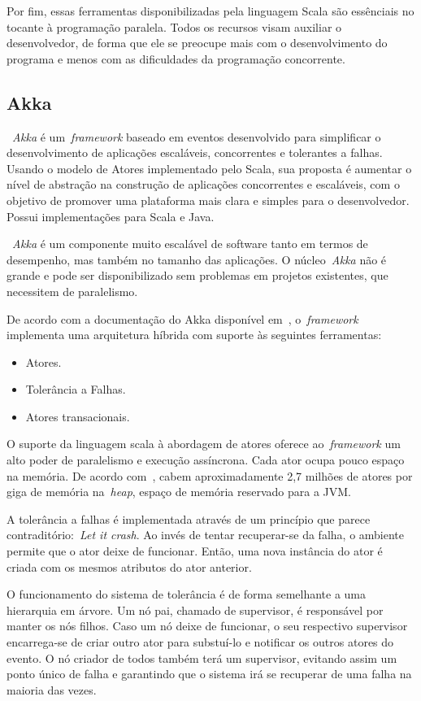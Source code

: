 Por fim, essas ferramentas disponibilizadas pela linguagem Scala são essênciais no tocante à programação paralela. Todos os recursos visam auxiliar o desenvolvedor, de forma que ele se preocupe mais com o desenvolvimento do programa e menos com as dificuldades da programação concorrente.

\subsection{Akka}

~\emph{Akka} é um~\emph{framework} baseado em eventos desenvolvido para simplificar o desenvolvimento de aplicações escaláveis, concorrentes e tolerantes a falhas. Usando o modelo de Atores implementado pelo Scala, sua proposta é aumentar o nível de abstração na construção de aplicações concorrentes e escaláveis, com o objetivo de promover uma plataforma mais clara e simples para o desenvolvedor. Possui implementações para Scala e Java.

~\emph{Akka} é um componente muito escalável de software tanto em termos de desempenho, mas também no tamanho das aplicações. O núcleo~\emph{Akka} não é grande e pode ser disponibilizado sem problemas em projetos existentes, que necessitem de paralelismo. 

De acordo com a documentação do Akka disponível em~\cite{akkaSite}, o~\emph{framework} implementa uma arquitetura híbrida com suporte às seguintes ferramentas:
\begin{itemize}
	\item Atores.
	\item Tolerância a Falhas.
	\item Atores transacionais.
\end{itemize}

O suporte da linguagem scala à abordagem de atores oferece ao~\emph{framework} um alto poder de paralelismo e execução assíncrona. Cada ator ocupa pouco espaço na memória. De acordo com~\cite{akkaSite}, cabem aproximadamente 2,7 milhões de atores por giga de memória na~\emph{heap}, espaço de memória reservado para a JVM.

A tolerância a falhas é implementada através de um princípio que parece contraditório:~\emph{Let it crash}. Ao invés de tentar recuperar-se da falha, o ambiente permite que o ator deixe de funcionar. Então, uma nova instância do ator é criada com os mesmos atributos do ator anterior.

O funcionamento do sistema de tolerância é de forma semelhante a uma hierarquia em árvore. Um nó pai, chamado de supervisor, é responsável por manter os nós filhos. Caso um nó deixe de funcionar, o seu respectivo supervisor encarrega-se de criar outro ator para substuí-lo e notificar os outros atores do evento. O nó criador de todos também terá um supervisor, evitando assim um ponto único de falha e garantindo que o sistema irá se recuperar de uma falha na maioria das vezes.

